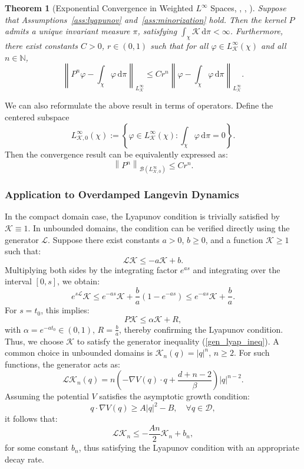 \documentclass[11pt, twoside]{report}
\newtheorem{theorem}{Theorem}[section]
\begin{document}
\begin{theorem}[Exponential Convergence in Weighted $L^\infty$ Spaces,  \texorpdfstring{\cite[Theorem~15.0.1]{Meyn2012-oq}}{}, \texorpdfstring{\cite[Theorem~1.2]{Hairer2011-of}}{}, \texorpdfstring{\cite[Theorem 2.25]{Lelievre2016-hx}}]
\label{thm:exp-conv-linf}
Suppose that Assumptions~\ref{ass:lyapunov} and~\ref{ass:minorization} hold. Then the kernel $P$ admits a unique invariant measure $\pi$, satisfying $\int_\chi \mathcal{K} \, \mathrm{d}\pi < \infty$. Furthermore, there exist constants $C > 0$, $r \in (0,1)$ such that for all $\varphi \in L^\infty_\mathcal{K}(\chi)$ and all $n \in \mathbb{N}$,
\[
\left\|P^n \varphi - \int_\chi \varphi \, \mathrm{d}\pi \right\|_{L^\infty_\mathcal{K}} \leq C r^n \left\|\varphi - \int_\chi \varphi \, \mathrm{d}\pi \right\|_{L^\infty_\mathcal{K}}.
\]
\end{theorem}
We can also reformulate the above result in terms of operators. Define the centered subspace
\[
L^\infty_{\mathcal{K},0}(\chi) := \left\{ \varphi \in L^\infty_{\mathcal{K}}(\chi) : \int_\chi \varphi \, \mathrm{d}\pi = 0 \right\}.
\]
Then the convergence result can be equivalently expressed as:
\[
\left\| P^n \right\|_{\mathcal{B}(L^\infty_{\mathcal{K},0})} \leq C r^n.
\]

\subsubsection{Application to Overdamped Langevin Dynamics}

In the compact domain case, the Lyapunov condition is trivially satisfied by $\mathcal{K} \equiv 1$. In unbounded domains, the condition can be verified directly using the generator $\mathcal{L}$. Suppose there exist constants $a > 0$, $b \geq 0$, and a function $\mathcal{K} \geq 1$ such that:
\begin{equation} \label{gen_lyap_ineq}
    \mathcal{L}\mathcal{K} \leq -a \mathcal{K} + b.
\end{equation}
Multiplying both sides by the integrating factor $e^{as}$ and integrating over the interval $[0, s]$, we obtain:
\[
e^{s \mathcal{L}} \mathcal{K} \leq e^{-as} \mathcal{K} + \frac{b}{a}(1 - e^{-as}) \leq e^{-as} \mathcal{K} + \frac{b}{a}.
\]
For $s = t_0$, this implies:
\[
P \mathcal{K} \leq \alpha \mathcal{K} + R,
\]
with $\alpha = e^{-a t_0} \in (0,1)$, $R = \frac{b}{a}$, thereby confirming the Lyapunov condition. Thus, we choose $\mathcal{K}$ to satisfy the generator inequality (\ref{gen_lyap_ineq}). A common choice in unbounded domains is $\mathcal{K}_n(q) = |q|^n$, $n \geq 2$. For such functions, the generator acts as:
\[
\mathcal{L} \mathcal{K}_n(q) = n \left( -\nabla V(q) \cdot q + \frac{d + n - 2}{\beta} \right) |q|^{n - 2}.
\]
Assuming the potential $V$ satisfies the asymptotic growth condition:
\[
q \cdot \nabla V(q) \geq A |q|^2 - B, \quad \forall q \in \mathcal{D},
\]
it follows that:
\[
\mathcal{L} \mathcal{K}_n \leq -\frac{A n}{2} \mathcal{K}_n + b_n,
\]
for some constant $b_n$, thus satisfying the Lyapunov condition with an appropriate decay rate.
\end{document}

